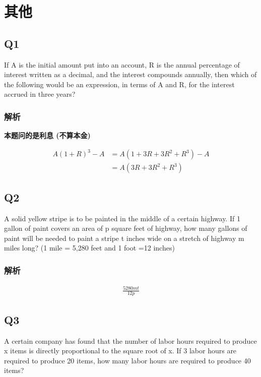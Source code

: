 \chapter{其他}

\section{Q1}

  If A is the initial amount put into an account, R is the annual percentage of
  interest written as a decimal, and the interest compounds annually,
  then which of the following would be an expression, in terms of A and R,
  for the interest accrued in three years?

  \subsection{解析}

    \textbf{本题问的是利息 (不算本金)}

    \begin{align*}
      A\left( 1 + R \right)^{3} - A
      &= A\left( 1 + 3R + 3R^{2} + R^{3} \right) - A \\
      &= A\left( 3R + 3R^{2} + R^{3} \right)
    \end{align*}

\section{Q2}

  A solid yellow stripe is to be painted in the middle of a certain highway.
  If 1 gallon of paint covers an area of p square feet of highway,
  how many gallons of paint will be needed to paint a stripe t inches wide
  on a stretch of highway m miles long?
  (1 mile = 5,280 feet and 1 foot =12 inches)

  \subsection{解析}

    \begin{align*}
      \frac{5280mt}{12p}
    \end{align*}

\section{Q3}

  A certain company has found that the number of labor hours required to
  produce x items is directly proportional to the square root of x. If 3
  labor hours are required to produce 20 items, how many labor hours are
  required to produce 40 items?

